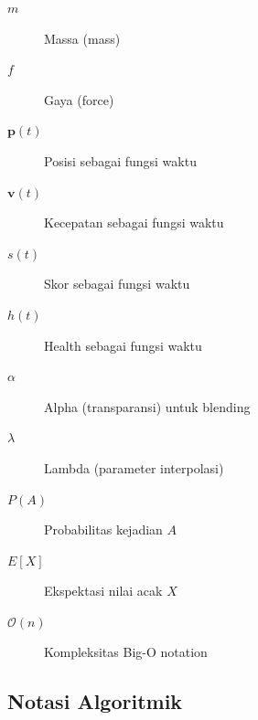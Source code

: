 \begin{description}
    \item[$m$] Massa (mass)
    \item[$f$] Gaya (force)
    \item[$\mathbf{p}(t)$] Posisi sebagai fungsi waktu
    \item[$\mathbf{v}(t)$] Kecepatan sebagai fungsi waktu
    \item[$s(t)$] Skor sebagai fungsi waktu
    \item[$h(t)$] Health sebagai fungsi waktu
    \item[$\alpha$] Alpha (transparansi) untuk blending
    \item[$\lambda$] Lambda (parameter interpolasi)
    \item[$P(A)$] Probabilitas kejadian $A$
    \item[$E{[X]}$] Ekspektasi nilai acak $X$
    \item[$\mathcal{O}(n)$] Kompleksitas Big-O notation
\end{description}

\subsection*{Notasi Algoritmik}

